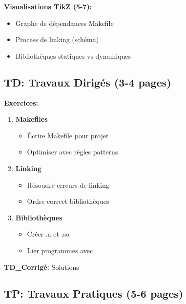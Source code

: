 \documentclass[10pt,a4paper]{article}
\begin{document}
\textbf{Visualisations TikZ (5-7):}
\begin{itemize}
\item Graphe de dépendances Makefile
\item Process de linking (schéma)
\item Bibliothèques statiques vs dynamiques
\end{itemize}

\subsection*{TD: Travaux Dirigés (3-4 pages)}

\textbf{Exercices:}
\begin{enumerate}
\item \textbf{Makefiles}
   \begin{itemize}
   \item Écrire Makefile pour projet
   \item Optimiser avec règles patterns
   \end{itemize}

\item \textbf{Linking}
   \begin{itemize}
   \item Résoudre erreurs de linking
   \item Ordre correct bibliothèques
   \end{itemize}

\item \textbf{Bibliothèques}
   \begin{itemize}
   \item Créer .a et .so
   \item Lier programmes avec
   \end{itemize}
\end{enumerate}

\textbf{TD\_Corrigé:} Solutions

\subsection*{TP: Travaux Pratiques (5-6 pages)}
\end{document}
